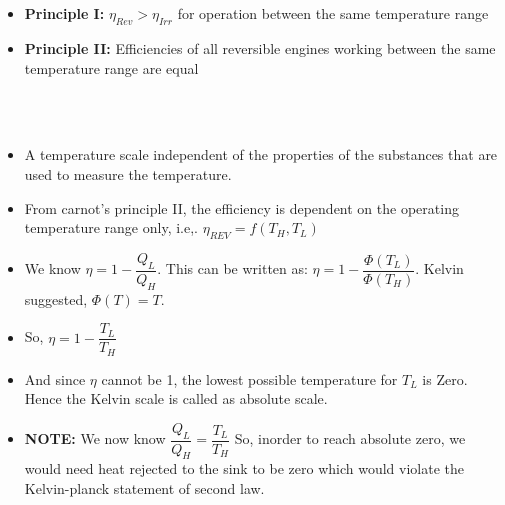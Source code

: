\documentclass[8pt]{article}
\begin{document}
		\hrulefill\\	%
\\
		\begin{itemize}
			\item \textbf{Principle I:} $\boxed{\eta _{Rev} > \eta _{Irr}}$ for operation between the same temperature range
			\item \textbf{Principle II:} Efficiencies of all reversible engines working between the same temperature range are equal
		\end{itemize}
		\hrulefill\\
\\
		\begin{itemize}
			\item A temperature scale independent of the properties of the substances that are used to measure the temperature. 
			\item From carnot's principle II, the efficiency is dependent on the operating temperature range only, i.e,. $\boxed{\eta _{REV} = f(T_H, T_L)}$
			\item We know $\eta = 1 - \dfrac{Q_L}{Q_H}$. This can be written as: $\eta = 1-\dfrac{\Phi (T_L)}{\Phi (T_H)}$. Kelvin suggested, $\Phi(T)=T$. 
			\item So, $\boxed{\eta = 1-\dfrac{T_L}{T_H}}$
			\item And since $\eta$ cannot be 1, the lowest possible temperature for $T_L$ is Zero. Hence the Kelvin scale is called as absolute scale. 
			\item \textbf{NOTE:} We now know $\boxed{\dfrac{Q_L}{Q_H}=\dfrac{T_L}{T_H}}$ So, inorder to reach absolute zero, we would need heat rejected to the sink to be zero which would violate the Kelvin-planck statement of second law.  
		\end{itemize}
	\hrulefill\\
\\
\end{document}
